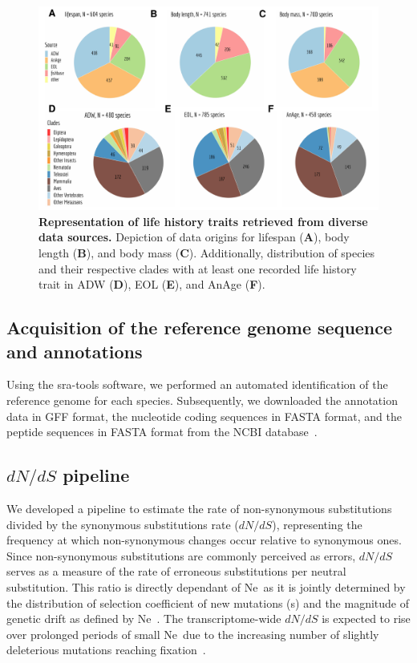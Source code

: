 \begin{figure}[t]   
         \centering
        \includegraphics[width=\textwidth]{Figure2.pdf}
                                                                           
    \caption[Representation of life history traits retrieved from diverse data sources]{\textbf{Representation of life history traits retrieved from diverse data sources.} Depiction of data origins for lifespan (\textbf{A}), body length (\textbf{B}), and body mass (\textbf{C}). Additionally, distribution of species and their respective clades with at least one recorded life history trait in \acrshort{ADW} (\textbf{D}), \acrshort{EOL} (\textbf{E}), and AnAge (\textbf{F}).\newline}
    \label{fig:gtdrift2}
\end{figure}

\subsection{Acquisition of the reference genome sequence and annotations}
Using the sra-tools software, we performed an automated identification of the reference genome for each species. Subsequently, we downloaded the annotation data in GFF format, the nucleotide coding sequences in FASTA format, and the peptide sequences in FASTA format from the NCBI database~\citep{sayers_database_2022}.

\subsection{$dN/dS$ pipeline}
We developed a pipeline to estimate the rate of non-synonymous substitutions divided by the synonymous substitutions rate (${dN}/{dS}$), representing the frequency at which non-synonymous changes occur relative to synonymous ones. Since non-synonymous substitutions are commonly perceived as errors, ${dN}/{dS}$ serves as a measure of the rate of erroneous substitutions per neutral substitution. This ratio is directly dependant of \acrshort{Ne}~as it is jointly determined by the distribution of selection coefficient of new mutations (s) and the magnitude of genetic drift as defined by \acrshort{Ne}~\citep{yang_synonymous_1998, nielsen_estimating_2003}. The transcriptome-wide ${dN}/{dS}$ is expected to rise over prolonged periods of small \acrshort{Ne}~due to the increasing number of slightly deleterious mutations reaching fixation~\citep{ohta_nearly_1992, galtier_adaptive_2016}.

